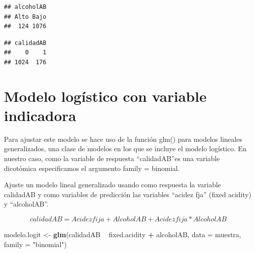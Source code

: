 \documentclass[
]{article}
\newenvironment{Shaded}{\begin{snugshade}}{\end{snugshade}}
\newcommand{\CommentTok}[1]{\textcolor[rgb]{0.56,0.35,0.01}{\textit{#1}}}
\newcommand{\DataTypeTok}[1]{\textcolor[rgb]{0.13,0.29,0.53}{#1}}
\newcommand{\DecValTok}[1]{\textcolor[rgb]{0.00,0.00,0.81}{#1}}
\newcommand{\KeywordTok}[1]{\textcolor[rgb]{0.13,0.29,0.53}{\textbf{#1}}}
\newcommand{\NormalTok}[1]{#1}
\newcommand{\OperatorTok}[1]{\textcolor[rgb]{0.81,0.36,0.00}{\textbf{#1}}}
\newcommand{\StringTok}[1]{\textcolor[rgb]{0.31,0.60,0.02}{#1}}
\begin{document}
\begin{verbatim}
## alcoholAB
## Alto Bajo 
##  124 1076
\end{verbatim}

\begin{Shaded}
\end{Shaded}

\begin{verbatim}
## calidadAB
##    0    1 
## 1024  176
\end{verbatim}

\hypertarget{modelo-loguxedstico-con-variable-indicadora}{%
\section{Modelo logístico con variable
indicadora}\label{modelo-loguxedstico-con-variable-indicadora}}

Para ajustar este modelo se hace uso de la función glm() para modelos
lineales generalizados, una clase de modelos en los que se incluye el
modelo logístico. En nuestro caso, como la variable de respuesta
``calidadAB''es una variable dicotómica especificamos el argumento
family = binomial.

Ajuste un modelo lineal generalizado usando como respuesta la variable
calidadAB y como variables de predicción las variables ``acidez fja''
(fixed acidity) y ``alcoholAB''.

\[calidadAB= Acidez fija+AlcoholAB +Acidez fija*AlcoholAB\]

\begin{Shaded}
\begin{Highlighting}[]
\NormalTok{modelo.logit <-}\StringTok{ }\KeywordTok{glm}\NormalTok{(calidadAB }\OperatorTok{~}\StringTok{ }\NormalTok{fixed.acidity }\OperatorTok{+}\StringTok{ }\NormalTok{alcoholAB, }\DataTypeTok{data =}\NormalTok{ muestra, }\DataTypeTok{family =} \StringTok{"binomial"}\NormalTok{)}
\end{Highlighting}
\end{Shaded}
\end{document}
